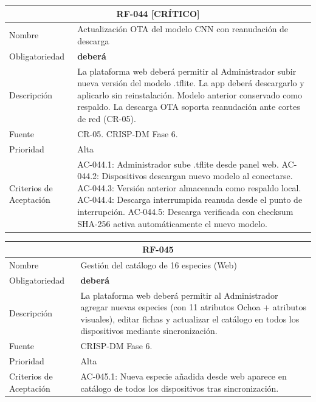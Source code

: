 \documentclass[12pt, a4paper]{article}
\newcommand{\criticomark}{\textcolor{criticolor}{\textbf{[CR\'ITICO]}}}
\begin{document}
\begin{longtable}{|p{3cm}|p{11.5cm}|}
\hline
\multicolumn{2}{|c|}{\textbf{RF-044} \criticomark} \\
\hline
Nombre & Actualizaci\'on OTA del modelo CNN con reanudaci\'on de descarga \\
\hline
Obligatoriedad & \textbf{deber\'a} \\
\hline
Descripci\'on & La plataforma web deber\'a permitir al Administrador subir nueva versi\'on del modelo .tflite. La app deber\'a descargarlo y aplicarlo sin reinstalaci\'on. Modelo anterior conservado como respaldo. La descarga OTA soporta reanudaci\'on ante cortes de red (CR-05). \\
\hline
Fuente & CR-05. CRISP-DM Fase 6. \\
\hline
Prioridad & Alta \\
\hline
Criterios de Aceptaci\'on &
AC-044.1: Administrador sube .tflite desde panel web. \newline
AC-044.2: Dispositivos descargan nuevo modelo al conectarse. \newline
AC-044.3: Versi\'on anterior almacenada como respaldo local. \newline
AC-044.4: Descarga interrumpida reanuda desde el punto de interrupci\'on. \newline
AC-044.5: Descarga verificada con checksum SHA-256 activa autom\'aticamente el nuevo modelo. \\
\hline
\end{longtable}

\begin{longtable}{|p{3cm}|p{11.5cm}|}
\hline
\multicolumn{2}{|c|}{\textbf{RF-045}} \\
\hline
Nombre & Gesti\'on del cat\'alogo de 16 especies (Web) \\
\hline
Obligatoriedad & \textbf{deber\'a} \\
\hline
Descripci\'on & La plataforma web deber\'a permitir al Administrador agregar nuevas especies (con 11 atributos Ochoa + atributos visuales), editar fichas y actualizar el cat\'alogo en todos los dispositivos mediante sincronizaci\'on. \\
\hline
Fuente & CRISP-DM Fase 6. \\
\hline
Prioridad & Alta \\
\hline
Criterios de Aceptaci\'on &
AC-045.1: Nueva especie a\~nadida desde web aparece en cat\'alogo de todos los dispositivos tras sincronizaci\'on. \\
\hline
\end{longtable}
\end{document}
